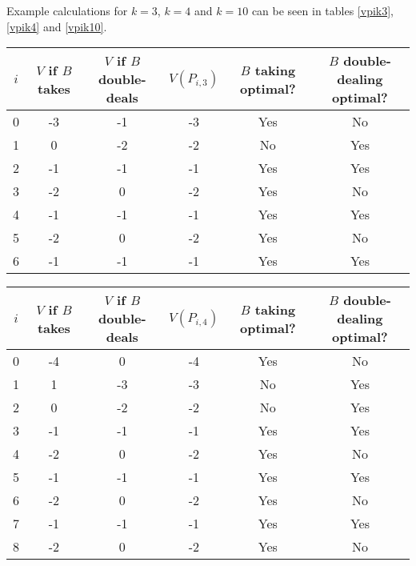 \documentclass[a4paper,twocolumn]{article}
\begin{document}
Example calculations for $k=3$, $k=4$ and $k=10$ can be seen in tables
\ref{vpik3}, \ref{vpik4} and \ref{vpik10}.

\begin{table*}[p]
  \centering
  \begin{tabular}{c c c c c c}
    $i$ & $V$ if $B$ takes & $V$ if $B$ double-deals & $V(P_{i,3})$ & $B$ taking optimal? & $B$ double-dealing optimal? \\
    \hline
    0 & -3 & -1 & -3 & Yes & No \\
    1 & 0 & -2 & -2 & No & Yes \\
    2 & -1 & -1 & -1 & Yes & Yes \\
    3 & -2 & 0 & -2 & Yes & No \\
    4 & -1 & -1 & -1 & Yes & Yes \\
    5 & -2 & 0 & -2 & Yes & No \\
    6 & -1 & -1 & -1 & Yes & Yes
  \end{tabular}
  \caption{$k=3$}
  \label{vpik3}
\end{table*}

\begin{table*}[p]
  \centering
  \begin{tabular}{c c c c c c}
    $i$ & $V$ if $B$ takes & $V$ if $B$ double-deals & $V(P_{i,4})$ & $B$ taking optimal? & $B$ double-dealing optimal? \\
    \hline
    0 & -4 & 0 & -4 & Yes & No \\
    1 & 1 & -3 & -3 & No & Yes \\
    2 & 0 & -2 & -2 & No & Yes \\
    3 & -1 & -1 & -1 & Yes & Yes \\
    4 & -2 & 0 & -2 & Yes & No \\
    5 & -1 & -1 & -1 & Yes & Yes \\
    6 & -2 & 0 & -2 & Yes & No \\
    7 & -1 & -1 & -1 & Yes & Yes \\
    8 & -2 & 0 & -2 & Yes & No
  \end{tabular}
  \caption{$k=4$}
  \label{vpik4}
\end{table*}
\end{document}
